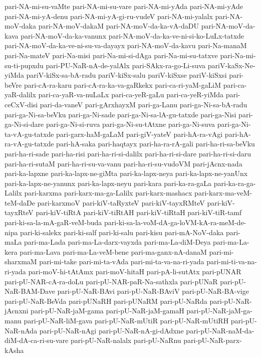 {pari-NA-mi-su-vaMte
pari-NA-mi-su-vare
pari-NA-mi-yAda
pari-NA-mi-yAde
pari-NA-mi-yA-denu
pari-NA-mi-yA-gi-ru-vudeV
pari-NA-mi-yalalx
pari-NA-moV-daka
pari-NA-moV-dakaM
pari-NA-moV-da-ka-vA-daDU
pari-NA-moV-da-kava
pari-NA-moV-da-ka-vanunx
pari-NA-moV-da-ka-ve-ni-si-ko-LuLx-tatxde
pari-NA-moV-da-ka-ve-ni-su-va-dayayx
pari-NA-moV-da-kavu
pari-Na-manaM
pari-Na-mateV
pari-Na-misi
pari-Na-mi-si-dAga
pari-Na-mi-su-tatxve
pari-Na-mi-su-ti-pupxdu
pari-PU-NaR-nA-de-yalAlx
pari-SAkx-ra-go-Li-suva
pariV-kaSx-Ne-yiMda
pariV-kiSx-sa-bA-radu
pariV-kiSx-salu
pariV-kiSxse
pariV-kiSxsi
pari-beVre
pari-cA-ra-karu
pari-cA-ra-ka-va-gaRkekx
pari-ca-ri-yaM-gaLiM
pari-ca-yaR-dalilx
pari-ca-yaR-va-nuLaLx
pari-ca-yeR-gaLu
pari-ca-yeR-yiMda
pari-ceCxV-disi
pari-da-vaneV
pari-gArxhayxM
pari-ga-Lanu
pari-ga-Ni-sa-bA-radu
pari-ga-Ni-sa-beVku
pari-ga-Ni-sade
pari-ga-Ni-sa-lA-gu-tatxde
pari-ga-Nisi
pari-ga-Ni-si-dare
pari-ga-Ni-si-ruva
pari-ga-Ni-su-tAtxne
pari-ga-Ni-suva
pari-ga-Ni-ta-vA-gu-tatxde
pari-garx-haM-gaLaM
pari-giV-yateV
pari-hA-ra-vAgi
pari-hA-ra-vA-gu-tatxde
pari-hA-saka
pari-haqtayx
pari-ha-ra-rA-gali
pari-ha-ri-sa-beVku
pari-ha-ri-sade
pari-ha-risi
pari-ha-ri-si-dalilx
pari-ha-ri-si-dare
pari-ha-ri-si-daru
pari-ha-ri-sutaM
pari-ha-ri-su-va-vanu
pari-ha-ri-su-vudoVM
pari-jAcnx-nada
pari-ka-lapxne
pari-ka-lapx-ne-giMta
pari-ka-lapx-neya
pari-ka-lapx-ne-yanUnx
pari-ka-lapx-ne-yanunx
pari-ka-lapx-neyu
pari-kara
pari-ka-ra-gaLa
pari-ka-ra-ga-Lalilx
pari-karxma
pari-karx-ma-ga-Lalilx
pari-karx-mashacx
pari-karx-ma-veM-teM-daDe
pari-karxmoV
pari-kiV-taRyxteV
pari-kiV-tayxRMteV
pari-kiV-tayxRteV
pari-kiV-tiRtA
pari-kiV-tiRtAH
pari-kiV-tiRtaH
pari-kiV-tiR-tamf
pari-ki-sa-la-mA-gaR-veM-buda
pari-ki-sa-la-voM-dA-ga-loVM-kA-ra-meM-de-nipa
pari-ki-salekx
pari-ki-salf
pari-ki-salu
pari-kisu
pari-mA-NoV-daka
pari-maLa
pari-ma-Lada
pari-ma-La-darx-vayxda
pari-ma-La-diM-Deya
pari-ma-La-kera
pari-ma-Lava
pari-ma-La-veM-bene
pari-ma-ganx-nA-danaM
pari-mi-sharxmaM
pari-mi-take
pari-mi-ta-vAda
pari-mi-ta-va-na-ri-yada
pari-mi-ti-va-na-ri-yada
pari-moV-hi-tAtAmx
pari-moV-hitaH
pari-pA-li-sutAtx
pari-pUNAR
pari-pU-NAR-cA-ra-doLu
pari-pU-NAR-paR-Na-sathxla
pari-pUNaR
pari-pU-NaR-BAM-Dave
pari-pU-NaR-BAvi
pari-pU-NaR-BAviV
pari-pU-NaR-BA-vige
pari-pU-NaR-BeVda
pari-pUNaRH
pari-pUNaRM
pari-pU-NaRda
pari-pU-NaR-jAcnxni
pari-pU-NaR-jaM-gama
pari-pU-NaR-jaM-gamaH
pari-pU-NaR-jaM-ga-manu
pari-pU-NaR-liM-gava
pari-pU-NaR-mUtiR
pari-pU-NaR-mUtiRH
pari-pU-NaR-nAda
pari-pU-NaR-nAgi
pari-pU-NaR-nA-gi-dAdxne
pari-pU-NaR-naM-da-diM-dA-ca-ri-su-vare
pari-pU-NaR-nalalx
pari-pU-NaRnu
pari-pU-NaR-parx-kAsha
}
